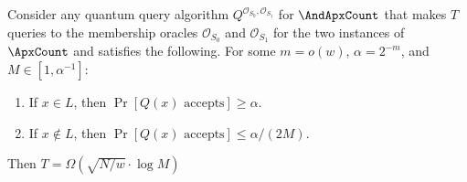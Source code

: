 \begin{lemma}
\label{lem:betterforqma}
Consider any quantum query algorithm $Q^{\mathcal{O}_{S_{0}},\mathcal{O}_{S_{1}}}$
for $\AndApxCount$
that makes $T$ queries to the membership oracles
$\mathcal{O}_{S_{0}}$ and $\mathcal{O}_{S_{1}}$
for the two instances of $\ApxCount$ and
satisfies the following. For some $m=o(w)$, $\alpha=2^{-m}$, and $M \in [1, \alpha^{-1}]$:
\begin{enumerate}
\item If $x \in L$, then $\Pr\left[Q(x) \text{ accepts}\right] \ge
\alpha$.
\item If $x \not\in L$, then $\Pr\left[Q(x) \text{ accepts}\right] \le
\alpha/(2 M)$.
\end{enumerate}
Then $T = \Omega\left(\sqrt{N/w} \cdot \log M\right)$
\end{lemma}
